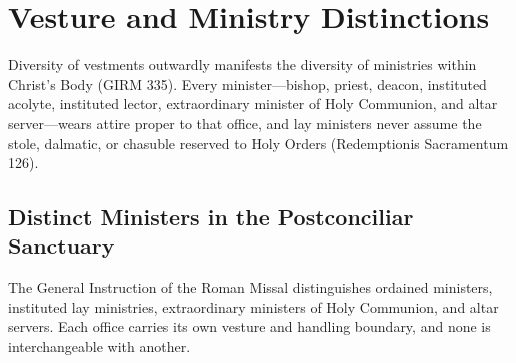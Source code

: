 \clearpage
\section{Vesture and Ministry Distinctions}
Diversity of vestments outwardly manifests the diversity of ministries within Christ's Body (GIRM 335). Every minister---bishop, priest, deacon, instituted acolyte, instituted lector, extraordinary minister of Holy Communion, and altar server---wears attire proper to that office, and lay ministers never assume the stole, dalmatic, or chasuble reserved to Holy Orders (Redemptionis Sacramentum 126).

\subsection*{Distinct Ministers in the Postconciliar Sanctuary}
The General Instruction of the Roman Missal distinguishes ordained ministers, instituted lay ministries, extraordinary ministers of Holy Communion, and altar servers. Each office carries its own vesture and handling boundary, and none is interchangeable with another.

